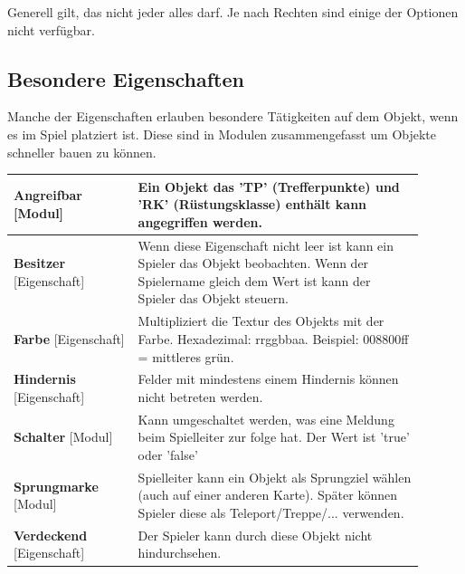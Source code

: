 \documentclass[german,10pt,a4paper,twocolumn,colorscheme=darkblue]{orarticle}
\begin{document}
		Generell gilt, das nicht jeder alles darf. Je nach Rechten sind einige der Optionen nicht verfügbar.
	
		\subsection{Besondere Eigenschaften}
			Manche der Eigenschaften erlauben besondere Tätigkeiten auf dem Objekt, wenn es im Spiel platziert ist. Diese sind in Modulen zusammengefasst um Objekte schneller bauen zu können.\\
			
			\begin{supertabular}{p{0.275\linewidth}|p{0.62\linewidth}}
				\textbf{Angreifbar} [Modul]      & Ein Objekt das 'TP' (Trefferpunkte) und 'RK' (Rüstungsklasse) enthält kann angegriffen werden. \\\hline
				\textbf{Besitzer} [Eigenschaft]  & Wenn diese Eigenschaft nicht leer ist kann ein Spieler das Objekt beobachten. Wenn der Spielername gleich dem Wert ist kann der Spieler das Objekt steuern.\\\hline
				\textbf{Farbe} [Eigenschaft]     & Multipliziert die Textur des Objekts mit der Farbe. Hexadezimal: rrggbbaa. Beispiel: 008800ff = mittleres grün.\\\hline
				\textbf{Hindernis} [Eigenschaft] & Felder mit mindestens einem Hindernis können nicht betreten werden.\\\hline
				\textbf{Schalter} [Modul]        & Kann umgeschaltet werden, was eine Meldung beim Spielleiter zur folge hat. Der Wert ist 'true' oder 'false'\\\hline
				\textbf{Sprungmarke} [Modul]     & Spielleiter kann ein Objekt als Sprungziel wählen (auch auf einer anderen Karte). Später können Spieler diese als Teleport/Treppe/... verwenden.\\\hline
				\textbf{Verdeckend} [Eigenschaft]& Der Spieler kann durch diese Objekt nicht hindurchsehen.\cr
			\end{supertabular}
			
\end{document}
